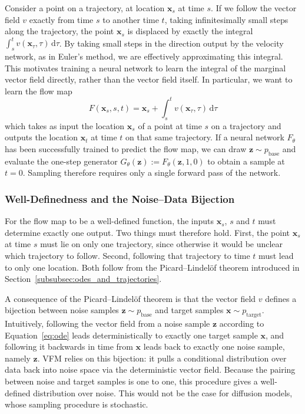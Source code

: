 \documentclass[12pt,a4paper]{report}
\begin{document}
Consider a point on a trajectory, at location $\mathbf{x}_s$ at time $s$. If we follow the vector field $v$ exactly from time $s$ to another time $t$, taking infinitesimally small steps along the trajectory, the point $\mathbf{x}_s$ is displaced by exactly the integral $\int_s^t v(\mathbf{x}_\tau,\tau)\,\mathrm{d}\tau$. By taking small steps in the direction output by the velocity network, as in Euler's method, we are effectively approximating this integral. This motivates training a neural network to learn the integral of the marginal vector field directly, rather than the vector field itself. In particular, we want to learn the flow map
\begin{equation}
F(\mathbf{x}_s,s,t)
=
\mathbf{x}_s+\int_{s}^{t}v(\mathbf{x}_\tau,\tau)\,\mathrm{d}\tau
\label{eq:flow_map}
\end{equation}
which takes as input the location $\mathbf{x}_s$ of a point at time $s$ on a trajectory and outputs the location $\mathbf{x}_t$ at time $t$ on that same trajectory. If a neural network $F_{\theta}$ has been successfully trained to predict the flow map, we can draw $\mathbf{z}\sim p_{\mathrm{base}}$ and evaluate the one-step generator $G_{\theta}(\mathbf{z}):=F_{\theta}(\mathbf{z},1,0)$ to obtain a sample at $t=0$. Sampling therefore requires only a single forward pass of the network.

\subsubsection{Well-Definedness and the Noise--Data Bijection}
\label{subsubsec:flow_map_bijection}
For the flow map to be a well-defined function, the inputs $\mathbf{x}_s$, $s$ and $t$ must determine exactly one output. Two things must therefore hold. First, the point $\mathbf{x}_s$ at time $s$ must lie on only one trajectory, since otherwise it would be unclear which trajectory to follow. Second, following that trajectory to time $t$ must lead to only one location. Both follow from the Picard--Lindel\"of theorem introduced in Section~\ref{subsubsec:odes_and_trajectories}. 

A consequence of the Picard--Lindel\"of theorem is that the vector field $v$ defines a bijection between noise samples $\mathbf{z}\sim p_{\mathrm{base}}$ and target samples $\mathbf{x}\sim p_{\mathrm{target}}$. Intuitively, following the vector field from a noise sample $\mathbf{z}$ according to Equation~\ref{eq:ode} leads deterministically to exactly one target sample $\mathbf{x}$, and following it backwards in time from $\mathbf{x}$ leads back to exactly one noise sample, namely $\mathbf{z}$. VFM relies on this bijection: it pulls a conditional distribution over data back into noise space via the deterministic vector field. Because the pairing between noise and target samples is one to one, this procedure gives a well-defined distribution over noise. This would not be the case for diffusion models, whose sampling procedure is stochastic.
\end{document}
